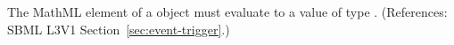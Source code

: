 \removedRule
  {The MathML  element of a \Trigger object must evaluate to a value of type .}
  {(References: SBML L3V1 Section~\ref{sec:event-trigger}.)}
